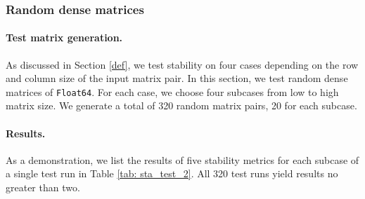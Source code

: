     \subsubsection{Random dense matrices}
        \paragraph{Test matrix generation.} As discussed in Section \ref{def}, we test stability on four cases depending on the row and column size of the input matrix pair. In this section, we test random dense matrices of \texttt{Float64}. For each case, we choose four subcases from low to high matrix size. We generate a total of 320 random matrix pairs, 20 for each subcase.
        
        \paragraph{Results.}
        As a demonstration, we list the results of five stability metrics for each subcase of a single test run in Table \ref{tab: sta_test_2}. All 320 test runs yield results no greater than two. 
    \newpage 
    
